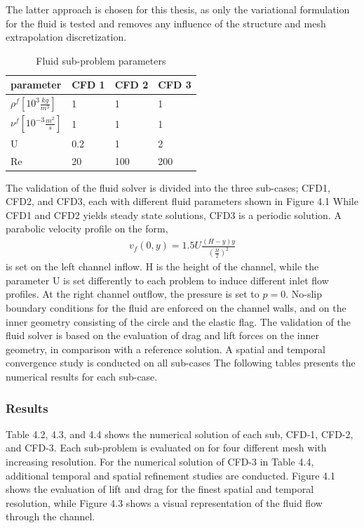 The latter approach is chosen for this thesis, as only the variational formulation for the fluid is tested and removes any influence of the structure and mesh extrapolation discretization. 
\newpage
\begin{table}[h!]
\centering
\label{my-label}
\begin{tabular}{ |p{3cm}||p{2cm}|p{2cm}|p{2cm}|  }
\hline
 parameter              & CFD 1 & CFD 2 & CFD 3 \\
 \hline
$\rho^f [10^{3}\frac{kg}{m^3}]$ & 1    & 1    & 1    \\
$\nu^f  [10^{-3}\frac{m^2}{s}]$  & 1    & 1    & 1    \\
U                      & 0.2  & 1    & 2    \\
Re                     & 20   & 100  & 200 \\
\hline
\end{tabular}
\caption{Fluid sub-problem parameters}
\end{table}
The validation of the fluid solver is divided into the three sub-cases; CFD1, CFD2, and CFD3, each with different fluid parameters shown in Figure 4.1 While  CFD1 and CFD2 yields steady state solutions, CFD3 is a periodic solution. A parabolic velocity profile on the form,
\begin{align*}
v_f(0, y) = 1.5 U\frac{(H -y)y}{(\frac{H}{2})^2}
\end{align*}
is set on the left channel inflow. H is the height of the channel, while the parameter U is set differently to each problem to induce different inlet flow profiles. At the right channel outflow, the pressure is set to $p = 0$. No-slip boundary conditions for the fluid are enforced on the channel walls, and on the inner geometry consisting of the circle and the elastic flag. The validation of the fluid solver is based on the evaluation of drag and lift forces on the inner geometry, in comparison with a reference solution. A spatial and temporal convergence study is conducted on all sub-cases The following tables presents the numerical results for each sub-case.

\subsubsection*{Results}
Table 4.2, 4.3, and 4.4 shows the numerical solution of each sub, CFD-1, CFD-2, and CFD-3. Each sub-problem is evaluated on for four different mesh with increasing resolution. For the numerical solution of CFD-3 in Table 4.4, additional temporal and spatial refinement studies are conducted. Figure 4.1 shows the evaluation of lift and drag for the finest spatial and temporal resolution, while Figure 4.3 shows a visual representation of the fluid flow through the channel. 

